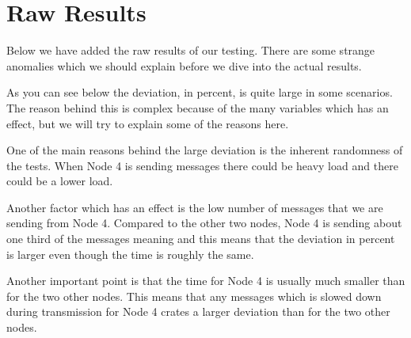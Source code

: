 \section {Raw Results} \label{RawResults}
Below we have added the raw results of our testing. There are some strange anomalies which we should explain before we dive into the actual results.

As you can see below the deviation, in percent, is quite large in some scenarios. The reason behind this is complex because of the many variables which has an effect, but we will try to explain some of the reasons here.

One of the main reasons behind the large deviation is the inherent randomness of the tests. When Node 4 is sending messages there could be heavy load and there could be a lower load. 

Another factor which has an effect is the low number of messages that we are sending from Node 4. Compared to the other two nodes, Node 4 is sending about one third of the messages meaning and this means that the deviation in percent is larger even though the time is roughly the same.

Another important point is that the time for Node 4 is usually much smaller than for the two other nodes. This means that any messages which is slowed down during transmission for Node 4 crates a larger deviation than for the two other nodes.
